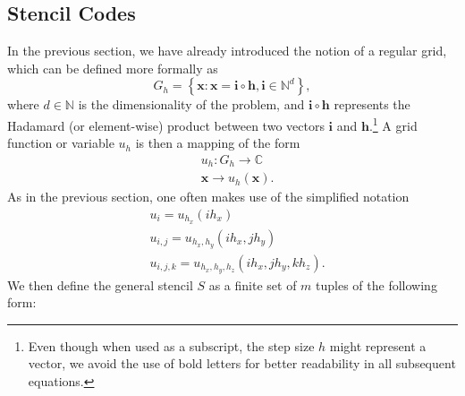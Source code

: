 \subsection{Stencil Codes}
\label{subsec:stencil-codes}
In the previous section, we have already introduced the notion of a regular grid, which can be defined more formally as
\begin{equation}
	G_{h} = \left\{ \bm{x} : \bm{x} = \bm{i} \circ \bm{h}, \bm{i} \in \mathbb{N}^d \right\},
\end{equation}
where $d \in \mathbb{N}$ is the dimensionality of the problem, and $\bm{i} \circ \bm{h}$ represents the Hadamard (or element-wise) product between two vectors $\bm{i}$ and $\bm{h}$.\footnote{Even though when used as a subscript, the step size $h$ might represent a vector, we avoid the use of bold letters for better readability in all subsequent equations.}
A grid function or variable $u_h$ is then a mapping of the form
\begin{equation}
	\begin{split}
		& u_h : G_{h}\to \mathbb{C} \\
		& \bm{x} \to u_h(\bm{x}).
	\end{split}
\end{equation}
As in the previous section, one often makes use of the simplified notation
\begin{equation}
	\begin{split}
		 & u_i = u_{h_x}(i h_x) \\
		& u_{i,j} = u_{h_x, h_y}(i h_x, j h_y) \\
		& u_{i,j,k} = u_{h_x, h_y, h_z}(i h_x, j h_y, k h_z).
	\end{split}
\end{equation}
We then define the general stencil $S$ as a finite set of $m$ tuples of the following form:

